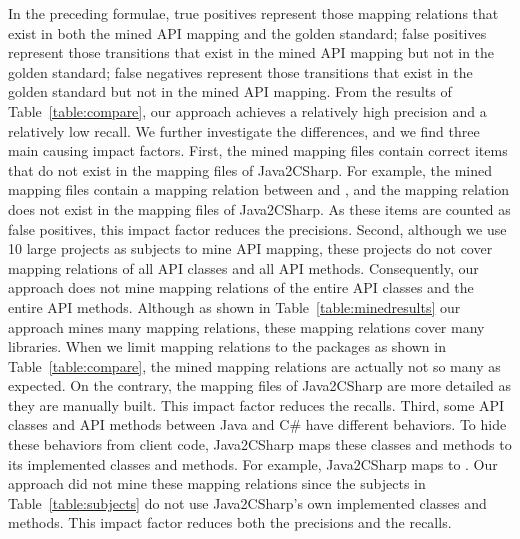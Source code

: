 In the preceding formulae, true positives represent those mapping
relations that exist in both the mined API mapping and the golden
standard; false positives represent those transitions that exist in
the mined API mapping but not in the golden standard; false
negatives represent those transitions that exist in the golden
standard but not in the mined API mapping. From the results of
Table~\ref{table:compare}, our approach achieves a relatively high
precision and a relatively low recall. We further investigate the
differences, and we find three main causing impact factors. First,
the mined mapping files contain correct items that do not exist in
the mapping files of Java2CSharp. For example, the mined mapping
files contain a mapping relation between 
and , and the mapping relation does
not exist in the mapping files of Java2CSharp. As these items are
counted as false positives, this impact factor reduces the
precisions. Second, although we use 10 large projects as subjects to
mine API mapping, these projects do not cover mapping relations of
all API classes and all API methods. Consequently, our approach does
not mine mapping relations of the entire API classes and the entire
API methods. Although as shown in Table~\ref{table:minedresults} our
approach mines many mapping relations, these mapping relations cover
many libraries. When we limit mapping relations to the packages as
shown in Table~\ref{table:compare}, the mined mapping relations are
actually not so many as expected. On the contrary, the mapping files
of Java2CSharp are more detailed as they are manually built. This
impact factor reduces the recalls. Third, some API classes and API
methods between Java and C\# have different behaviors. To hide these
behaviors from client code, Java2CSharp maps these classes and
methods to its implemented classes and methods. For example,
Java2CSharp maps  to
. Our approach did not
mine these mapping relations since the subjects in
Table~\ref{table:subjects} do not use Java2CSharp's own implemented
classes and methods. This impact factor reduces both the precisions
and the recalls.

